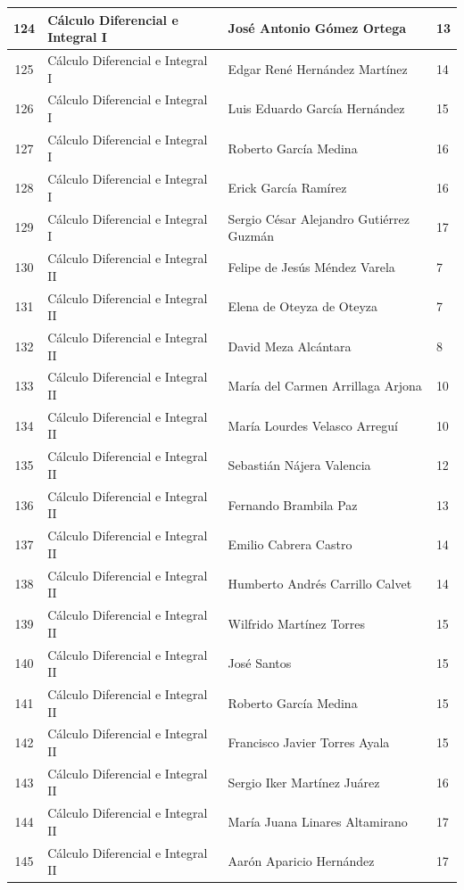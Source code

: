 {\begin{longtable}{|c|p{6.5cm}|p{5cm}|p{1.5cm}|}
124 & Cálculo Diferencial e Integral I & José Antonio Gómez Ortega & 13 \\ \hline
125 & Cálculo Diferencial e Integral I & Edgar René Hernández Martínez & 14 \\ \hline
126 & Cálculo Diferencial e Integral I & Luis Eduardo García Hernández & 15 \\ \hline
127 & Cálculo Diferencial e Integral I & Roberto García Medina & 16 \\ \hline
128 & Cálculo Diferencial e Integral I & Erick García Ramírez & 16 \\ \hline
129 & Cálculo Diferencial e Integral I & Sergio César Alejandro Gutiérrez Guzmán & 17 \\ \hline
130 & Cálculo Diferencial e Integral II & Felipe de Jesús Méndez Varela & 7 \\ \hline
131 & Cálculo Diferencial e Integral II & Elena de Oteyza de Oteyza & 7 \\ \hline
132 & Cálculo Diferencial e Integral II & David Meza Alcántara & 8 \\ \hline
133 & Cálculo Diferencial e Integral II & María del Carmen Arrillaga Arjona & 10 \\ \hline
134 & Cálculo Diferencial e Integral II & María Lourdes Velasco Arreguí & 10 \\ \hline
135 & Cálculo Diferencial e Integral II & Sebastián Nájera Valencia & 12 \\ \hline
136 & Cálculo Diferencial e Integral II & Fernando Brambila Paz & 13 \\ \hline
137 & Cálculo Diferencial e Integral II & Emilio Cabrera Castro & 14 \\ \hline
138 & Cálculo Diferencial e Integral II & Humberto Andrés Carrillo Calvet & 14 \\ \hline
139 & Cálculo Diferencial e Integral II & Wilfrido Martínez Torres & 15 \\ \hline
140 & Cálculo Diferencial e Integral II & José Santos & 15 \\ \hline
141 & Cálculo Diferencial e Integral II & Roberto García Medina & 15 \\ \hline
142 & Cálculo Diferencial e Integral II & Francisco Javier Torres Ayala & 15 \\ \hline
143 & Cálculo Diferencial e Integral II & Sergio Iker Martínez Juárez & 16 \\ \hline
144 & Cálculo Diferencial e Integral II & María Juana Linares Altamirano & 17 \\ \hline
145 & Cálculo Diferencial e Integral II & Aarón Aparicio Hernández & 17 \\ \hline

\end{longtable}}

